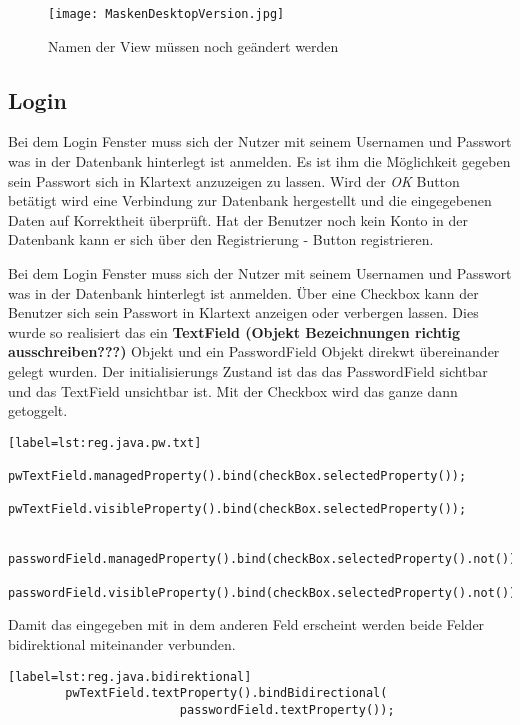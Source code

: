 \begin{figure}[h]
  \begin{center}
    \texttt{[image: MaskenDesktopVersion.jpg]}
  		  \caption{Namen der View müssen noch geändert werden}
     \label{fig.MaskenDesktopVersion}
  \end{center}
\end{figure}\newpage

\subsection{Login}
\label{subsec.login}
Bei dem Login Fenster muss sich der Nutzer mit seinem Usernamen und Passwort was in der Datenbank hinterlegt ist anmelden. Es ist ihm die Möglichkeit gegeben sein Passwort sich in Klartext anzuzeigen zu lassen. Wird der \textit{OK} Button betätigt wird eine Verbindung zur Datenbank hergestellt und die eingegebenen Daten auf Korrektheit überprüft. Hat der Benutzer noch kein Konto in der Datenbank kann er sich über den Registrierung - Button registrieren.

Bei dem Login Fenster muss sich der Nutzer mit seinem Usernamen und Passwort was in der Datenbank hinterlegt ist anmelden. Über eine Checkbox kann der Benutzer sich sein Passwort in Klartext anzeigen oder verbergen lassen. Dies wurde so realisiert das ein \textbf{TextField (Objekt Bezeichnungen richtig ausschreiben???)} Objekt und ein PasswordField Objekt direkwt übereinander gelegt wurden. Der initialisierungs Zustand ist das das PasswordField sichtbar und das TextField unsichtbar ist. Mit der Checkbox wird das ganze dann getoggelt.
\begin{lstlisting}[caption={Java Passwort-, Textfeld Un-, Sichtbar},captionpos=b][label=lst:reg.java.pw.txt]
		pwTextField.managedProperty().bind(checkBox.selectedProperty());
		pwTextField.visibleProperty().bind(checkBox.selectedProperty());

		passwordField.managedProperty().bind(checkBox.selectedProperty().not());
		passwordField.visibleProperty().bind(checkBox.selectedProperty().not());
\end{lstlisting}

Damit das eingegeben mit in dem anderen Feld erscheint werden beide Felder bidirektional miteinander verbunden.
\begin{lstlisting}[caption={Java Passwort-, Textfeld bidirektional},captionpos=b][label=lst:reg.java.bidirektional]
		pwTextField.textProperty().bindBidirectional(
						passwordField.textProperty());
\end{lstlisting}

